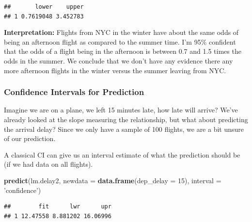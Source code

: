 \documentclass[
]{book}
\newenvironment{Shaded}{\begin{snugshade}}{\end{snugshade}}
\newcommand{\DataTypeTok}[1]{\textcolor[rgb]{0.13,0.29,0.53}{#1}}
\newcommand{\DecValTok}[1]{\textcolor[rgb]{0.00,0.00,0.81}{#1}}
\newcommand{\FloatTok}[1]{\textcolor[rgb]{0.00,0.00,0.81}{#1}}
\newcommand{\KeywordTok}[1]{\textcolor[rgb]{0.13,0.29,0.53}{\textbf{#1}}}
\newcommand{\NormalTok}[1]{#1}
\newcommand{\OperatorTok}[1]{\textcolor[rgb]{0.81,0.36,0.00}{\textbf{#1}}}
\newcommand{\StringTok}[1]{\textcolor[rgb]{0.31,0.60,0.02}{#1}}
\begin{document}
\begin{Shaded}
\end{Shaded}

\begin{verbatim}
##       lower    upper
## 1 0.7619048 3.452783
\end{verbatim}

\textbf{Interpretation:} Flights from NYC in the winter have about the same odds of being an afternoon flight as compared to the summer time. I'm 95\% confident that the odds of a flight being in the afternoon is between 0.7 and 1.5 times the odds in the summer. We conclude that we don't have any evidence there any more afternoon flights in the winter versus the summer leaving from NYC.

\hypertarget{confidence-intervals-for-prediction}{%
\subsubsection{Confidence Intervals for Prediction}\label{confidence-intervals-for-prediction}}

Imagine we are on a plane, we left 15 minutes late, how late will arrive? We've already looked at the slope measuring the relationship, but what about predicting the arrival delay? Since we only have a sample of 100 flights, we are a bit unsure of our prediction.

A classical CI can give us an interval estimate of what the prediction should be (if we had data on all flights).

\begin{Shaded}
\begin{Highlighting}[]
\KeywordTok{predict}\NormalTok{(lm.delay2, }\DataTypeTok{newdata =} \KeywordTok{data.frame}\NormalTok{(}\DataTypeTok{dep_delay =} \DecValTok{15}\NormalTok{), }\DataTypeTok{interval =} \StringTok{'confidence'}\NormalTok{)}
\end{Highlighting}
\end{Shaded}

\begin{verbatim}
##        fit      lwr      upr
## 1 12.47558 8.881202 16.06996
\end{verbatim}
\end{document}
